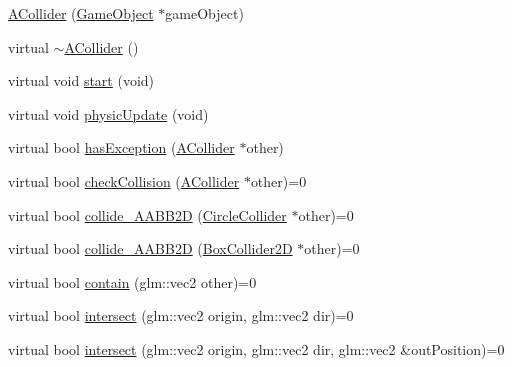 \begin{DoxyCompactItemize}
\item 
\mbox{\hyperlink{class_beer_engine_1_1_component_1_1_a_collider_a807a20c3c5c411d832d371523f02220c}{A\+Collider}} (\mbox{\hyperlink{class_beer_engine_1_1_game_object}{Game\+Object}} $\ast$game\+Object)
\item 
virtual \mbox{\hyperlink{class_beer_engine_1_1_component_1_1_a_collider_a10094dea61f15535b8707b7171adc15f}{$\sim$\+A\+Collider}} ()
\item 
virtual void \mbox{\hyperlink{class_beer_engine_1_1_component_1_1_a_collider_a5da2e0713f11237c7a963295f508cd3b}{start}} (void)
\item 
virtual void \mbox{\hyperlink{class_beer_engine_1_1_component_1_1_a_collider_a23a7d16be7b24965987d17a7549d3005}{physic\+Update}} (void)
\item 
virtual bool \mbox{\hyperlink{class_beer_engine_1_1_component_1_1_a_collider_a3d07cf39499899192c348016b6a97353}{has\+Exception}} (\mbox{\hyperlink{class_beer_engine_1_1_component_1_1_a_collider}{A\+Collider}} $\ast$other)
\item 
virtual bool \mbox{\hyperlink{class_beer_engine_1_1_component_1_1_a_collider_ad9367c0e75c941509322fb984d16de00}{check\+Collision}} (\mbox{\hyperlink{class_beer_engine_1_1_component_1_1_a_collider}{A\+Collider}} $\ast$other)=0
\item 
virtual bool \mbox{\hyperlink{class_beer_engine_1_1_component_1_1_a_collider_ab9acc12bf6017b81f3515264238ce3d5}{collide\+\_\+\+A\+A\+B\+B2D}} (\mbox{\hyperlink{class_beer_engine_1_1_component_1_1_circle_collider}{Circle\+Collider}} $\ast$other)=0
\item 
virtual bool \mbox{\hyperlink{class_beer_engine_1_1_component_1_1_a_collider_ae972d39620da804c72fb9799c167bf4b}{collide\+\_\+\+A\+A\+B\+B2D}} (\mbox{\hyperlink{class_beer_engine_1_1_component_1_1_box_collider2_d}{Box\+Collider2D}} $\ast$other)=0
\item 
virtual bool \mbox{\hyperlink{class_beer_engine_1_1_component_1_1_a_collider_a3d7b4784b8ba49a9d0fe72e8ff00ad1e}{contain}} (glm\+::vec2 other)=0
\item 
virtual bool \mbox{\hyperlink{class_beer_engine_1_1_component_1_1_a_collider_a84f924f6c0631f5f17b4e1852495a505}{intersect}} (glm\+::vec2 origin, glm\+::vec2 dir)=0
\item 
virtual bool \mbox{\hyperlink{class_beer_engine_1_1_component_1_1_a_collider_a2ffff777d86ac72aee0c0586ab651db8}{intersect}} (glm\+::vec2 origin, glm\+::vec2 dir, glm\+::vec2 \&out\+Position)=0

\end{DoxyCompactItemize}
